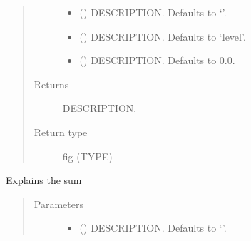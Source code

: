 \documentclass[letterpaper,10pt,english]{sphinxmanual}
\begin{document}
\begin{fulllineitems}
\begin{fulllineitems}
\begin{quote}
\begin{description}
\begin{itemize}
\item {} 
\sphinxAtStartPar
{} (\sphinxstyleliteralemphasis{\sphinxupquote{, }}) \textendash{} DESCRIPTION. Defaults to ‘’.

\item {} 
\sphinxAtStartPar
{} (\sphinxstyleliteralemphasis{\sphinxupquote{, }}) \textendash{} DESCRIPTION. Defaults to ‘level’.

\item {} 
\sphinxAtStartPar
{} (\sphinxstyleliteralemphasis{\sphinxupquote{, }}) \textendash{} DESCRIPTION. Defaults to 0.0.

\end{itemize}

\item[{Returns}] \leavevmode
\sphinxAtStartPar
DESCRIPTION.

\item[{Return type}] \leavevmode
\sphinxAtStartPar
fig (TYPE)

\end{description}\end{quote}

\end{fulllineitems}


\begin{fulllineitems}
\label{\detokenize{attribution/modeldekom:modeldekom.totdif.explain_sum}}
\pysigstartsignatures
{}
\pysigstopsignatures
\sphinxAtStartPar
Explains the sum
\begin{quote}\begin{description}
\item[{Parameters}] \leavevmode\begin{itemize}
\item {} 
\sphinxAtStartPar
{} (\sphinxstyleliteralemphasis{\sphinxupquote{, }}) \textendash{} DESCRIPTION. Defaults to ‘’.


\end{itemize}
\end{description}
\end{quote}
\end{fulllineitems}
\end{fulllineitems}
\end{document}
